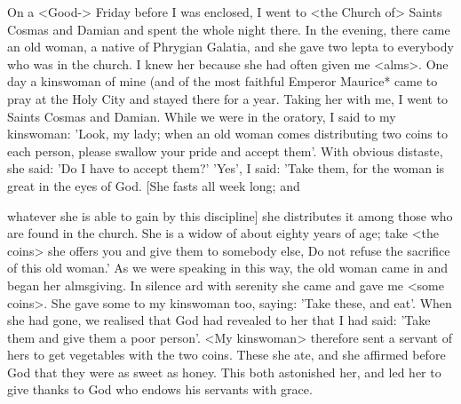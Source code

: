 On a <Good-> Friday before I was enclosed, I went to <the Church
of> Saints Cosmas and Damian and spent the whole night there. In
the evening, there came an old woman, a native of Phrygian
Galatia, and she gave two lepta to everybody who was in the
church. I knew her because she had often given me <alms>. One
day a kinswoman of mine (and of the most faithful Emperor
Maurice* came to pray at the Holy City and stayed there for a year.
Taking her with me, I went to Saints Cosmas and Damian. While
we were in the oratory, I said to my kinswoman: 'Look, my lady;
when an old woman comes distributing two coins to each person,
please swallow your pride and accept them'. With obvious distaste,
she said: 'Do I have to accept them?' 'Yes', I said: 'Take them, for
the woman is great in the eyes of God. [She fasts all week long; and

whatever she is able to gain by this discipline] she distributes it
among those who are found in the church. She is a widow of about
eighty years of age; take <the coins> she offers you and give them
to somebody else, Do not refuse the sacrifice of this old woman.' As
we were speaking in this way, the old woman came in and began
her almsgiving. In silence ard with serenity she came and gave me
<some coins>. She gave some to my kinswoman too, saying: 'Take
these, and eat'. When she had gone, we realised that God had
revealed to her that I had said: 'Take them and give them a poor
person'. <My kinswoman> therefore sent a servant of hers to get
vegetables with the two coins. These she ate, and she affirmed
before God that they were as sweet as honey. This both astonished
her, and led her to give thanks to God who endows his servants
with grace.

